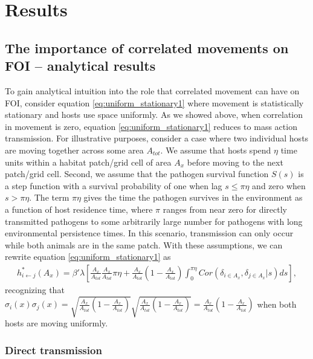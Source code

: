 \documentclass[letterpaper]{article}
\begin{document}
\section*{Results}

\subsection*{The importance of correlated movements on FOI -- analytical results}

To gain analytical intuition into the role that correlated movement can have on FOI, consider equation \ref{eq:uniform_stationary1} where movement is statistically stationary and hosts use space uniformly.  As we showed above, when correlation in movement is zero, equation \ref{eq:uniform_stationary1} reduces to mass action transmission. 
For illustrative purposes, consider a case where two individual hosts are moving together across some area $A_{tot}$. We assume that hosts spend $\eta$ time units within a habitat patch/grid cell of area $A_x$ before moving to the next patch/grid cell. Second, we assume that the pathogen survival function $S(s)$ is a step function with a survival probability of one when lag $s \leq \pi \eta$ and zero when $s > \pi \eta$.  
The term $\pi \eta$ gives the time the pathogen survives in the environment as a function of host residence time, where $\pi$ ranges from near zero for directly transmitted pathogens to some arbitrarily large number for pathogens with long environmental persistence times.  
In this scenario, transmission can only occur while both animals are in the same patch. With these assumptions, we can rewrite equation \ref {eq:uniform_stationary1} as 
\begin{equation}
    \begin{aligned}
        h^*_{i \leftarrow j}(A_x) = \beta' \lambda \left[\frac{A_x}{A_{tot}}\frac{A_x}{A_{tot}} \pi \eta + \frac{A_x}{A_{tot}}(1 - \frac{A_x}{A_{tot}}) \int_{0}^{\pi \eta} Cor(\delta_{i \in A_x}, \delta_{j \in A_x} | s) ds\right],
    \end{aligned}
    \label{eq:uniform_stationary2}
\end{equation}
recognizing that $\sigma_i(x) \sigma_j(x) = \sqrt{\frac{A_x}{A_{tot}}(1 - \frac{A_x}{A_{tot}})}\sqrt{\frac{A_x}{A_{tot}}(1 - \frac{A_x}{A_{tot}})} = \frac{A_x}{A_{tot}}(1 - \frac{A_x}{A_{tot}})$ when both hosts are moving uniformly.

\subsubsection*{Direct transmission}
\end{document}
